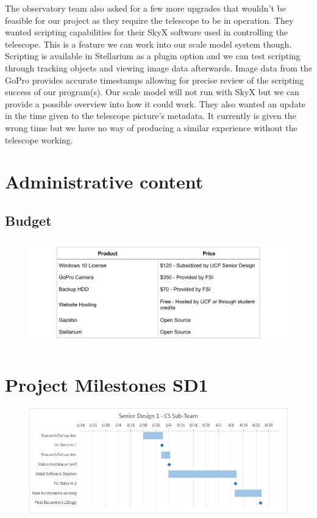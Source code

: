 \documentclass[12pt]{report}
\begin{document}
The observatory team also asked for a few more upgrades that wouldn’t be feasible for our project as they require the telescope to be in operation. They wanted scripting capabilities for their SkyX software used in controlling the telescope. This is a feature we can work into our scale model system though. Scripting is available in Stellarium as a plugin option and we can test scripting through tracking objects and viewing image data afterwards. Image data from the GoPro provides accurate timestamps allowing for precise review of the scripting success of our program(s). Our scale model will not run with SkyX but we can provide a possible overview into how it could work. They also wanted an update in the time given to the telescope picture’s metadata. It currently is given the wrong time but we have no way of producing a similar experience without the telescope working.

\clearpage

\section{Administrative content}

\subsection*{Budget}

\begin{figure}[h]
	\centering
	\includegraphics[width=\linewidth]{budgettable}
\end{figure}

\section*{Project Milestones SD1}

\begin{figure}[h]
	\centering
	\includegraphics[width=\linewidth]{SD1Gantt}
\end{figure}
\end{document}
